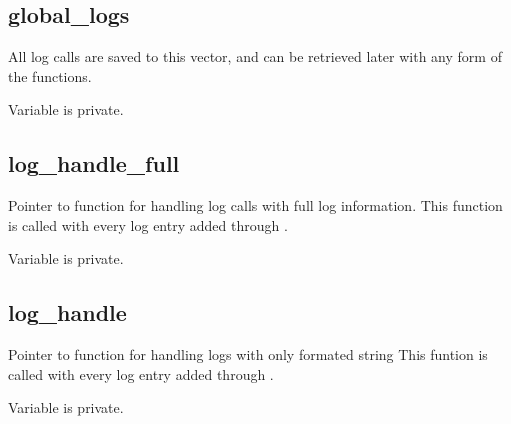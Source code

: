\documentclass[letterpaper,10pt,english]{sphinxmanual}
\begin{document}
\subsection{global\_logs}
\label{\detokenize{log:global-logs}}

\begin{fulllineitems}
\label{\detokenize{log:_CPPv2N6pessum11global_logsE}}%
\pysigstartmultiline
{}%
\pysigstopmultiline
All log calls are saved to this vector, and can be retrieved later with any
form of the {\hyperref[\detokenize{log:_CPPv2N6pessum6GetLogEi}]{}} functions.

 Variable is private.

\end{fulllineitems}



\subsection{log\_handle\_full}
\label{\detokenize{log:log-handle-full}}

\begin{fulllineitems}
\label{\detokenize{log:_CPPv2N6pessum15log_handle_fullE}}%
\pysigstartmultiline
{}%
\pysigstopmultiline
Pointer to function for handling log calls with full log information.
This function is called with every log entry added through {\hyperref[\detokenize{log:_CPPv2N6pessum3LogEiNSt6stringENSt6stringEz}]{}}.

 Variable is private.

\end{fulllineitems}



\subsection{log\_handle}
\label{\detokenize{log:log-handle}}

\begin{fulllineitems}
\label{\detokenize{log:_CPPv2N6pessum10log_handleE}}%
\pysigstartmultiline
{}%
\pysigstopmultiline
Pointer to function for handling logs with only formated string
This funtion is called with every log entry added through {\hyperref[\detokenize{log:_CPPv2N6pessum3LogEiNSt6stringENSt6stringEz}]{}}.

 Variable is private.

\end{fulllineitems}
\end{document}
